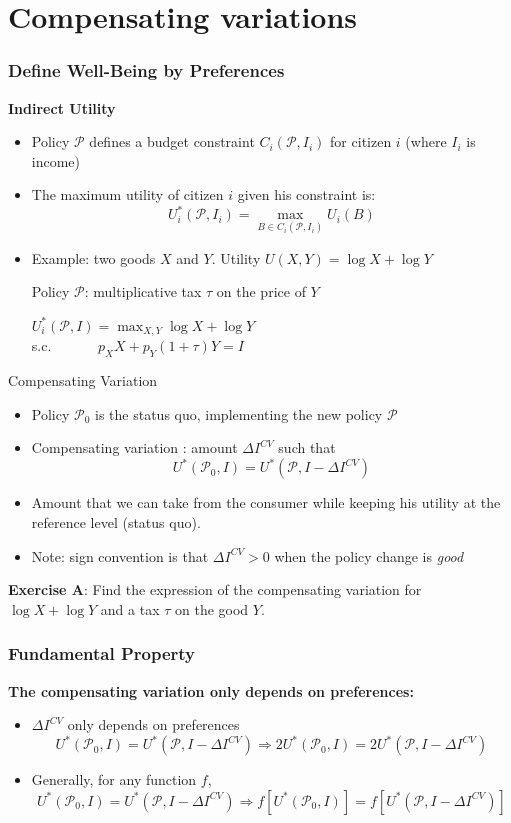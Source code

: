 \documentclass[handout]{beamer}
\newcommand{\mcl}{\mathcal}
\newcommand{\mdp}{\medskip \pause}
\begin{document}
\section{Compensating variations}

\begin{frame} \frametitle{Define Well-Being by Preferences}
\textbf{Indirect Utility} \begin{itemize}
\item
Policy $\mcl P$ defines a budget constraint $C_i(\mcl P,I_i)$ for citizen $i$ (where $I_i$ is income)
\item The maximum utility of citizen $i$ given his constraint is: $$U_i^*(\mcl P,I_i) = \max_{B \in C_i(\mcl P, I_i)} U_i(B)$$
\item Example: two goods $X$ and $Y$. Utility $U(X,Y) = \log X + \log Y$ \medskip

Policy $\mcl P$: multiplicative tax $\tau$ on the price of
$Y$\mdp

$U_i^*(\mcl P,I) = \max_{X,Y} \log X + \log Y$ \\ s.c. $\quad \quad \quad
p_X  X + p_Y(1 + \tau) Y = I$ \end{itemize}
\end{frame}

\begin{frame}{Compensating Variation}
  \begin{itemize} \item Policy $\mcl P_0$ is the status
quo, implementing the new policy $\mcl P$ \item Compensating variation :  amount $\Delta I^{CV}$  such that $$U^*(\mcl P_0,I) = U^*(\mcl P,
I - \Delta I^{CV})$$    \item    Amount that we can take from the consumer while keeping his utility at the reference level (status quo).  

\item Note: sign convention is that  $\Delta I^{CV}>0$ when the policy change is \textit{good} 

 \end{itemize}
 
 \textbf{Exercise A}: Find the expression of the compensating variation for $\log X + \log Y$ and a tax $\tau$ on the good $Y$. 
\end{frame}

\begin{frame} \frametitle{Fundamental Property}

\textbf{The compensating variation only depends on preferences:} \begin{itemize} \item $\Delta I^{CV}$ only depends on preferences $$U^*(\mcl P_0,I) = U^*(\mcl P, I - \Delta I^{CV})
\Rightarrow 2 U^*(\mcl P_0,I) = 2  U^*(\mcl P, I- \Delta I^{CV})$$ \item Generally, for any function $f$, $$U^*(\mcl P_0,I) = U^*(\mcl P, I - \Delta I^{CV})
\Rightarrow f[U^*(\mcl P_0,I)] = f[ U^*(\mcl P, I - \Delta I^{CV})]$$\end{itemize}
 
\end{frame}
 
\end{document}
